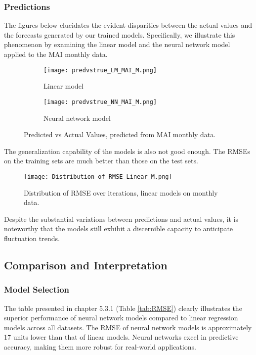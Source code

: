 \documentclass{article}
\begin{document}
\subsubsection{Predictions}

The figures below elucidates the evident disparities between the actual values and the forecasts generated by our trained models. Specifically, we illustrate this phenomenon by examining the linear model and the neural network model applied to the MAI monthly data. 

\begin{figure}[H]
  \centering
  \begin{subfigure}{0.48\linewidth}
    \texttt{[image: predvstrue\_LM\_MAI\_M.png]}
    \caption{Linear model}
  \end{subfigure}
  \hfill
  \begin{subfigure}{0.48\linewidth}
    \texttt{[image: predvstrue\_NN\_MAI\_M.png]}
    \caption{Neural network model}
  \end{subfigure}
  \caption{Predicted vs Actual Values, predicted from MAI monthly data.}
  \label{fig:both}
\end{figure}

\noindent The generalization capability of the models is also not good enough. The RMSEs on the training sets are much better than those on the test sets.

\begin{figure}[H]
    \centering \texttt{[image: Distribution of RMSE\_Linear\_M.png]}
    \caption{Distribution of RMSE over iterations, linear models on monthly data.}
\end{figure}


\noindent Despite the substantial variations between predictions and actual values, it is noteworthy that the models still exhibit a discernible capacity to anticipate fluctuation trends.

\subsection{Comparison and Interpretation}

\subsubsection{Model Selection}
The table presented in chapter 5.3.1 (Table \ref{tab:RMSE}) clearly illustrates the superior performance of neural network models compared to linear regression models across all datasets. The RMSE of neural network models is approximately 17 units lower than that of linear models. Neural networks excel in predictive accuracy, making them more robust for real-world applications.
\end{document}
